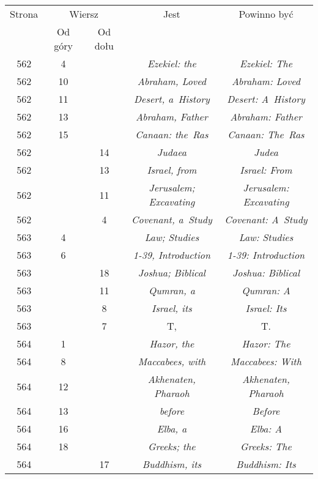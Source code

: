 \documentclass[a4paper,11pt]{article}
\begin{document}
\begin{center}
  \begin{tabular}{|c|c|c|c|c|}
    \hline
    Strona & \multicolumn{2}{c|}{Wiersz} & Jest
                              & Powinno być \\ \cline{2-3}
    & Od góry & Od dołu & & \\
    \hline
    562 &  4 & & \textit{Ezekiel: the} & \textit{Ezekiel: The} \\
    562 & 10 & & \textit{Abraham, Loved} & \textit{Abraham: Loved} \\
    562 & 11 & & \textit{Desert, a~History} & \textit{Desert: A~History} \\
    562 & 13 & & \textit{Abraham, Father} & \textit{Abraham: Father} \\
    562 & 15 & & \textit{Canaan: the~Ras} & \textit{Canaan: The~Ras} \\
    562 & & 14 & \textit{Judaea} & \textit{Judea} \\
    562 & & 13 & \textit{Israel, from} & \textit{Israel: From} \\
    562 & & 11 & \textit{Jerusalem; Excavating}
           & \textit{Jerusalem: Excavating} \\
    562 & &  4 & \textit{Covenant, a~Study} & \textit{Covenant: A~Study} \\
    563 &  4 & & \textit{Law; Studies} & \textit{Law: Studies} \\
    563 &  6 & & \textit{1-39, Introduction}
           & \textit{1-39: Introduction} \\
    563 & & 18 & \textit{Joshua; Biblical} & \textit{Joshua: Biblical} \\
    563 & & 11 & \textit{Qumran, a} & \textit{Qumran: A} \\
    563 & &  8 & \textit{Israel, its} & \textit{Israel: Its} \\
    563 & &  7 & T, & T. \\
    564 &  1 & & \textit{Hazor, the} & \textit{Hazor: The} \\
    564 &  8 & & \textit{Maccabees, with} & \textit{Maccabees: With} \\
    564 & 12 & & \textit{Akhenaten, Pharaoh}
           & \textit{Akhenaten, Pharaoh} \\
    564 & 13 & & \textit{before} & \textit{Before} \\
    564 & 16 & & \textit{Elba, a} & \textit{Elba: A} \\
    564 & 18 & & \textit{Greeks; the} & \textit{Greeks: The} \\
    564 & & 17 & \textit{Buddhism, its} & \textit{Buddhism: Its} \\

\end{tabular}
\end{center}
\end{document}

